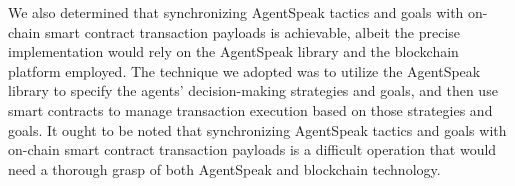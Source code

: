 \vspace{.5cm}

We also determined that synchronizing AgentSpeak tactics and goals with on-chain smart contract transaction payloads is achievable, albeit the precise implementation would rely on the AgentSpeak library and the blockchain platform employed. The technique we adopted was to utilize the AgentSpeak library to specify the agents' decision-making strategies and goals, and then use smart contracts to manage transaction execution based on those strategies and goals. It ought to be noted that synchronizing AgentSpeak tactics and goals with on-chain smart contract transaction payloads is a difficult operation that would need a thorough grasp of both AgentSpeak and blockchain technology.
